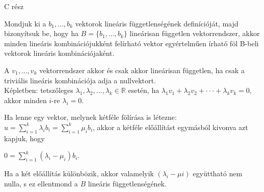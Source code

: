 \begin{frame}[plain]
\begin{tcolorbox}[center, colback={myyellow}, coltext={black}, colframe={myyellow}]
    {\RHuge C rész}
    \mmedskip
\end{tcolorbox}
\end{frame}

\begin{frame}
  \begin{tcolorbox}[title={1. (4p)}]
    Mondjuk ki a $b_1,...,b_k$ vektorok lineáris függetlenségének definícióját, majd bizonyítsuk be, hogy ha $B = \{b_1,...,b_k\}$ lineárisan független vektorrendszer, akkor minden lineáris kombinációjukként felírható vektor egyértelműen írható föl B-beli vektorok lineáris kombinációjaként.
  \tcblower
  
    A $v_1,...,v_k$ vektorrendszer akkor és csak akkor lineárisan független, ha csak a triviális lineáris kombinációja adja a nullvektort.\\

    Képletben: tetszőleges ${\lambda}_1,{\lambda}_2,...,{\lambda}_k \in \mathbb{R}$ esetén, ha ${\lambda}_1v_1 + {\lambda}_2v_2 +  \cdot  \cdot  \cdot  + {\lambda}_kv_k = 0$, akkor minden $i$-re ${\lambda}_i = 0$.\\
    \mmedskip

    Ha lenne egy vektor, melynek kétféle fölírása is létezne: $u = \sum_{i = 1}^k {\lambda}_ib_i = \sum_{i = 1}^k {\mu}_ib_i$, akkor a kétféle előállítást egymásból kivonva azt kapjuk, hogy\\
    \mmedskip
    
    $0 = \sum_{i = 1}^k ({\lambda}_i - {\mu}_i)b_i$.\\
    \mmedskip
    
    Ha a két előállítás különbözik, akkor valamelyik $({\lambda}_i-{\mu}i)$ együttható nem nulla, s ez ellentmond a $B$ lineáris függetlenségének.
  \end{tcolorbox}
\end{frame}


